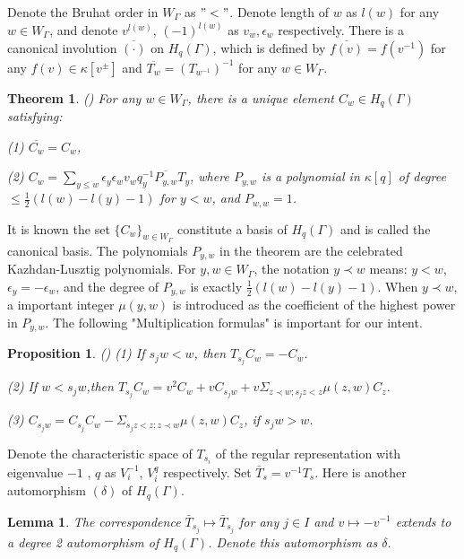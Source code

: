 \def\CTEXPreproc{Created by ctex v0.2.12, don't edit!}\documentclass[11pt]{article}
\newtheorem{thm}{Theorem}[section]
\newtheorem{lem}{Lemma}[section]
\newtheorem{prop}{Proposition}[section]
\begin{document}
   Denote the Bruhat order in $W_{\Gamma}$ as $ "<" $. Denote length of $w$ as $l(w)$ for any $w\in W_{\Gamma}$, and denote $ v^{l(w)} $, $(-1)^{l(w)} $ as
   $v_w , \epsilon_w $ respectively. There is a canonical involution $\overline{( \cdot  ) }$ on $H_{q}(\Gamma)$, which is defined by $ \overline{f(v)  } = f ( v^{-1}  ) $ for any $f(v)\in \kappa[v^{\pm}]$ and $ \overline{  T_{w} } = ( T_{w^{-1}}   )^{-1}  $ for any $w\in W_{\Gamma}$.

   \begin{thm}(\cite{KL2})
   For any $w\in W_{\Gamma}$, there is a unique element $ C_w \in H_q (\Gamma) $ satisfying:

  \noindent (1) $\overline{C_w } = C_w  $,

  \noindent (2) $C_w = \sum_{y\leq w} \epsilon_y \epsilon_w v_w q^{-1}
   _y \overline{  P_{y,w} } T_y  $, where $P_{y,w}$ is a polynomial in $\kappa[q ]$ of degree $\leq \frac{1}{2}( l(w)-l(y)-1    )$ for $y<w$, and $P_{w,w}=1$.

   \end{thm}


   It is known the set $ \{ C_w \} _{w\in W_{\Gamma }} $ constitute a basis of $H_q (\Gamma)$ and is called the canonical basis.  The polynomials $P_{y,w}$ in the theorem are the celebrated Kazhdan-Lusztig polynomials. For $y,w\in W_{\Gamma}$, the notation $y \prec w $ means:
    $y<w$, $\epsilon_y = -\epsilon_w$, and the degree of $P_{y,w}$ is exactly $\frac{1}{2}( l(w)- l(y) -1  )$. When $ y\prec w $, a important integer $ \mu (y,w )$ is introduced as the coefficient of the highest power in $P_{y,w}$.
 The  following "Multiplication formulas" is important for our intent.

   \begin{prop}(\cite{KL2})
   (1) If $s_j w < w$, then $T_{s_j} C_w = -C_w $.

   \noindent(2) If $w< s_j w $,then $T_{s_j} C_w = v^2 C_w + v C_{s_j w} + v \Sigma _{ z\prec w; s_j z<z } \mu(z,w) C_z $.

   \noindent(3) $C_{s_j w} = C_{s_j} C_{w}- \Sigma _{s_j z <z ; z\prec w   } \mu(z,w) C_z $, if $s_j w>w$.
   \end{prop}

   Denote the characteristic space of $T_{s_i}$ of the regular representation with eigenvalue $-1$ , $q$ as $V^{-1}_i $, $V^{q} _i$ respectively. Set $\bar{T}_{s}= v^{-1} T_s $. Here is another automorphism $(\delta )$ of $H_{q}(\Gamma)$.

   \begin{lem}  The correspondence $ \bar{T}_{s_j }\mapsto \bar{T}_{s_j }  $ for any $j\in I$ and $v\mapsto -v^{-1}$  extends to a degree 2 automorphism of
   $H_{q}(\Gamma)$. Denote this automorphism as $\delta$.

   \end{lem}
\end{document}
